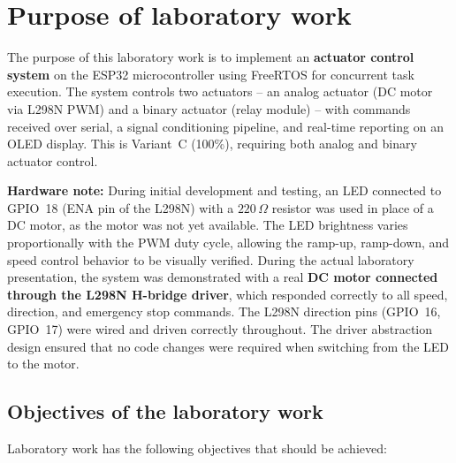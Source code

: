 \section{Purpose of laboratory work}

The purpose of this laboratory work is to implement an \textbf{actuator control system}
on the ESP32 microcontroller using FreeRTOS for concurrent task execution. The system
controls two actuators -- an analog actuator (DC motor via L298N PWM) and a binary
actuator (relay module) -- with commands received over serial, a signal conditioning
pipeline, and real-time reporting on an OLED display.
This is Variant~C (100\%), requiring both analog and binary actuator control.

\textbf{Hardware note:} During initial development and testing, an LED connected to
GPIO~18 (ENA pin of the L298N) with a $220\,\Omega$ resistor was used in place of a
DC motor, as the motor was not yet available. The LED brightness varies proportionally
with the PWM duty cycle, allowing the ramp-up, ramp-down, and speed control behavior
to be visually verified. During the actual laboratory presentation, the system was
demonstrated with a real \textbf{DC motor connected through the L298N H-bridge driver},
which responded correctly to all speed, direction, and emergency stop commands.
The L298N direction pins (GPIO~16, GPIO~17) were wired and driven correctly throughout.
The driver abstraction design ensured that no code changes were required when
switching from the LED to the motor.

\subsection{Objectives of the laboratory work}

Laboratory work has the following objectives that should be achieved:

